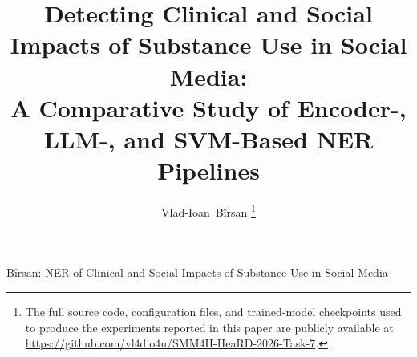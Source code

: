 \documentclass[journal]{IEEEtran}
\begin{document}
%
\title{Detecting Clinical and Social Impacts of Substance Use in Social Media:\\
A Comparative Study of Encoder-, LLM-, and SVM-Based NER Pipelines}
%
%
%

\author{Vlad-Ioan~B\^irsan%
\thanks{The full source code, configuration files, and trained-model
checkpoints used to produce the experiments reported in this paper are
publicly available at \protect\url{https://github.com/vl4dio4n/SMM4H-HeaRD-2026-Task-7}.}}

% 
%



%
{B\^irsan: NER of Clinical and Social Impacts of Substance Use in Social Media}
% 
\end{document}
